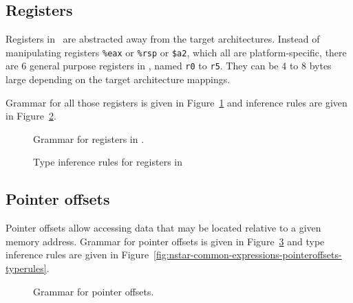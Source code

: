 \subsection{Registers}\label{subsec:nstar-common-expressions-registers}

Registers in \nstar\ are abstracted away from the target architectures.
Instead of manipulating registers \texttt{\%eax} or \texttt{\%rsp} or \texttt{\$a2}, which all are platform-specific, there are 6 general purpose registers in \nstar, named \texttt{r0} to \texttt{r5}.
They can be 4 to 8 bytes large depending on the target architecture mappings.

Grammar for all those registers is given in Figure~\ref{fig:nstar-common-expressions-registers-grammar} and inference rules are given in Figure~\ref{fig:nstar-common-expressions-registers-typerules}.

\begin{figure}[htb]
  \centering


  \caption{Grammar for registers in \nstar.}
  \label{fig:nstar-common-expressions-registers-grammar}
\end{figure}

\begin{figure}[htb]
  \centering


  \caption{Type inference rules for registers in \nstar}
  \label{fig:nstar-common-expressions-registers-typerules}
\end{figure}

\subsection{Pointer offsets}\label{fig:nstar-common-expressions-pointeroffsets}

Pointer offsets allow accessing data that may be located relative to a given memory address.
Grammar for pointer offsets is given in Figure~\ref{fig:nstar-common-expressions-pointeroffsets-grammar} and type inference rules are given in Figure~\ref{fig:nstar-common-expressions-pointeroffsets-typerules}.

\begin{figure}[H]
  \centering


  \caption{Grammar for pointer offsets.}
  \label{fig:nstar-common-expressions-pointeroffsets-grammar}
\end{figure}

